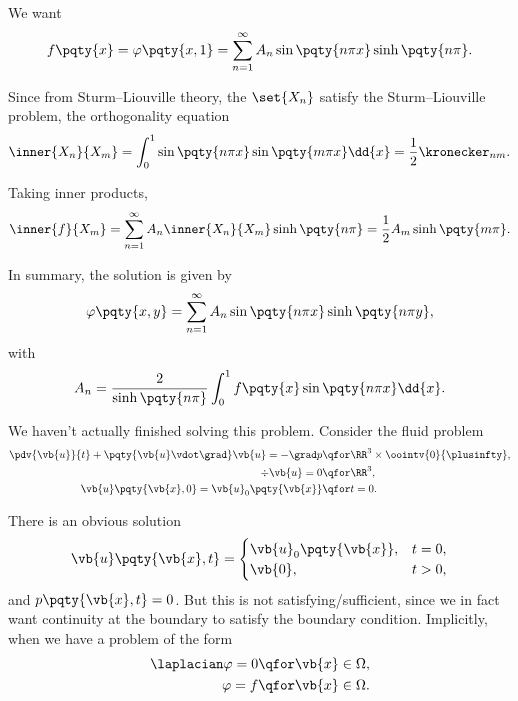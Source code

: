 {We want
\begin{equation}
    f\pqty{x} = \varphi\pqty{x, 1} = \sum_{n = 1}^{\infty} A_n \sin \pqty{n \pi x} \sinh \pqty{n \pi}.
\end{equation}

Since from Sturm--Liouville theory, the \(\set{X_n}\) satisfy the Sturm--Liouville problem, the orthogonality equation
\begin{equation}
    \inner{X_n}{X_m} = \int_{0}^{1} \sin \pqty{n \pi x} \sin \pqty{m \pi x} \dd{x} = \frac{1}{2} \kronecker_{nm}.
\end{equation}

Taking inner products,
\begin{equation}
    \inner{f}{X_m} = \sum_{n = 1}^{\infty} A_n \inner{X_n}{X_m} \sinh \pqty{n \pi} = \frac{1}{2} A_m \sinh \pqty{m \pi}.
\end{equation}

In summary, the solution is given by
\begin{equation}
    \varphi\pqty{x, y} = \sum_{n = 1}^{\infty} A_n \sin \pqty{n \pi x} \sinh \pqty{n \pi y},
\end{equation}
with
\begin{equation}
    A_n = \frac{2}{\sinh\pqty{n \pi}} \int_{0}^{1} f\pqty{x} \sin \pqty{n \pi x} \dd{x}.
\end{equation}

\small

We haven't actually finished solving this problem. Consider the fluid problem
\begin{subequations}
    \begin{align}
        \pdv{\vb{u}}{t} + \pqty{\vb{u} \vdot \grad} \vb{u} = - \grad p &\qfor \RR^3 \times \oointv{0}{\plusinfty}, \\
        \div \vb{u} = 0 &\qfor \RR^3, \\
        \vb{u} \pqty{\vb{x}, 0} = \vb{u}_0 \pqty{\vb{x}} &\qfor t = 0.
    \end{align}
\end{subequations}

There is an obvious solution
\begin{equation}
    \vb{u} \pqty{\vb{x}, t} = \begin{cases}
        \vb{u}_0 \pqty{\vb{x}}, & t = 0, \\
        \vb{0}, & t > 0,
    \end{cases}
\end{equation}
and \(p\pqty{\vb{x}, t} = 0\). But this is not satisfying/sufficient, since we in fact want continuity at the boundary to satisfy the boundary condition. Implicitly, when we have a problem of the form
\begin{subequations}
    \begin{align}
        \laplacian \varphi = 0 &\qfor \vb{x} \in \Omega, \\
        \varphi = f &\qfor \vb{x} \in \Omega.
    \end{align}
\end{subequations}

}
